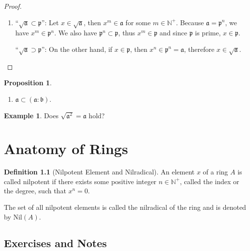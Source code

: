 \documentclass[a4paper]{book}
\theoremstyle{definition}
\newtheorem{definition}{Definition}[]
\newtheorem{example}{Example}[definition]
\newtheorem{proposition}[definition]{Proposition}
\begin{document}
\begin{proof}
\begin{enumerate}
        \item ``\(\sqrt{\mathfrak{a}} \subset \mathfrak{p}\)'': Let \(x \in \sqrt{\mathfrak{a}}\), then \(x^m \in \mathfrak{a}\) for some \(m \in \mathbb{N}^+\). Because \(\mathfrak{a} = \mathfrak{p}^n\), we have \(x^m \in \mathfrak{p}^n\). We also have \(\mathfrak{p}^n \subset \mathfrak{p}\), thus \(x^m \in \mathfrak{p}\) and since \(\mathfrak{p}\) is prime, \(x \in \mathfrak{p}\).
        
        ``\(\sqrt{\mathfrak{a}} \supset \mathfrak{p}\)'': On the other hand, if \(x \in \mathfrak{p}\), then \(x^n \in \mathfrak{p}^n = \mathfrak{a}\), therefore \(x \in \sqrt{\mathfrak{a}}\).
    \end{enumerate}
\end{proof}

\begin{thmbox}
    \begin{proposition}
        \begin{enumerate}
            \item \(\mathfrak{a} \subset (\mathfrak{a} : \mathfrak{b})\).
        \end{enumerate}
    \end{proposition}
\end{thmbox}

\begin{exmbox}
    \begin{example}
        Does \(\sqrt{\mathfrak{a}^2} = \mathfrak{a}\) hold?
    \end{example}
\end{exmbox}

\chapter{Anatomy of Rings}

\begin{defbox}
    \begin{definition}[Nilpotent Element and Nilradical]
        An element \(x\) of a ring \(A\) is called nilpotent if there exists some positive integer \(n \in \mathbb{N}^+\), called the index or the degree, such that \(x^n = 0\).

        The set of all nilpotent elements is called the nilradical of the ring and is denoted by \(\mathrm{Nil}(A)\).
    \end{definition}
\end{defbox}

\section{Exercises and Notes}
\end{document}
